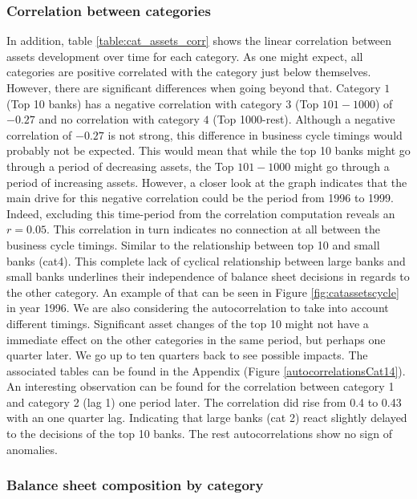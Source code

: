 \documentclass[12pt, a4paper]{article} %
\begin{document}
\subsubsection{Correlation between categories}
In addition, table \ref{table:cat_assets_corr} shows the linear correlation between assets development over time for each category. As one might expect, all categories are positive correlated with the category just below themselves. However, there are significant differences when going beyond that. Category $1$ (Top 10 banks) has a negative correlation with category $3$ (Top $101-1000$) of $-0.27$ and no correlation with category $4$ (Top 1000-rest). Although a negative correlation of $-0.27$ is not strong, this difference in business cycle timings would probably not be expected. 
This would mean that while the top 10 banks might go through a period of decreasing assets, the Top $101-1000$ might go through a period of increasing assets. However, a closer look at the graph indicates that the main drive for this negative correlation could be the period from 1996 to 1999. Indeed, excluding this time-period from the correlation computation reveals an $r=0.05$. This correlation in turn indicates no connection at all between the business cycle timings. Similar to the relationship between top 10 and small banks (cat4). This complete lack of cyclical relationship between large banks and small banks underlines their independence of balance sheet decisions in regards to the other category. 
An example of that can be seen in Figure \ref{fig:catassetscycle} in year 1996. 
We are also considering the autocorrelation to take into account different timings. Significant asset changes of the top 10 might not have a immediate effect on the other categories in the same period, but perhaps one quarter later. We go up to ten quarters back to see possible impacts. The associated tables can be found in the Appendix (Figure \ref{autocorrelationsCat14}). An interesting observation can be found for the correlation between category 1 and category 2 (lag 1) one period later. The correlation did rise from 0.4 to 0.43 with an one quarter lag. Indicating that large banks (cat 2) react slightly delayed to the decisions of the top 10 banks. The rest autocorrelations show no sign of anomalies. 

\subsubsection{Balance sheet composition by category}
\end{document}
